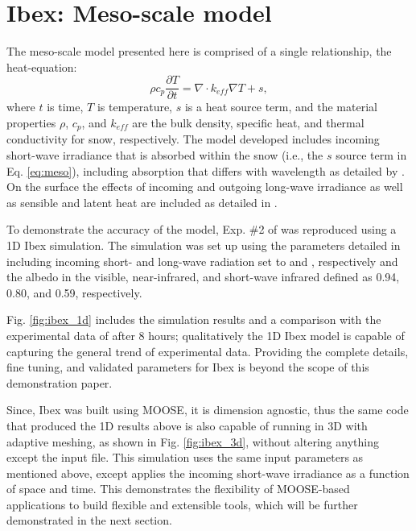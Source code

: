 \section{Ibex: Meso-scale model}\label{sec:ibex}
The meso-scale model presented here is comprised of a single relationship, the heat-equation:
\begin{equation}\label{eq:meso}
\rho c_p \frac{\partial{T}}{\partial t} = \nabla \cdot k_{eff} \nabla T + s,
\end{equation}
where $t$ is time, $T$ is temperature, $s$ is a heat source term, and the material properties $\rho$, $c_p$, and $k_{eff}$ are the bulk density, specific heat, and thermal conductivity for snow, respectively. The model developed includes incoming short-wave irradiance that is absorbed within the snow (i.e., the $s$ source term in Eq. \eqref{eq:meso}), including absorption that differs with wavelength as detailed by \citet[][Ch.4]{slaughter2010numerical}. On the surface the effects of incoming and outgoing long-wave irradiance as well as sensible and latent heat are included as detailed in \citet{slaughter2010numerical}.

To demonstrate the accuracy of the model, Exp. \#2 of \citet{morstad2007experimental} was reproduced using a 1D Ibex simulation. The simulation was set up using the parameters detailed in \citet[][Ch.4]{slaughter2010numerical} including incoming short- and long-wave radiation set to  and , respectively and the albedo in the visible, near-infrared, and short-wave infrared defined as 0.94, 0.80, and 0.59, respectively.

Fig. \ref{fig:ibex_1d} includes the simulation results and a comparison with the experimental data of \citet{morstad2007experimental} after 8 hours; qualitatively the 1D Ibex model is capable of capturing the general trend of experimental data. Providing the complete details, fine tuning, and validated parameters for Ibex is beyond the scope of this demonstration paper.

Since, Ibex was built using MOOSE, it is dimension agnostic, thus the same code that produced the 1D results above is also capable of running in 3D with adaptive meshing, as shown in Fig. \ref{fig:ibex_3d}, without altering anything except the input file. This simulation uses the same input parameters as mentioned above, except applies the incoming short-wave irradiance as a function of space and time. This demonstrates the flexibility of MOOSE-based applications to build flexible and extensible tools, which will be further demonstrated in the next section.

